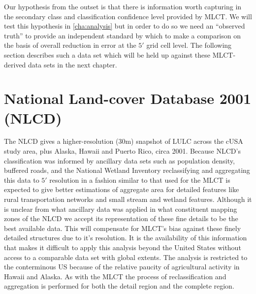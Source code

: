 Our hypothesis from the outset is that there is information worth
capturing in the secondary class and classification confidence level
provided by MLCT.  We will test this hypothesis in
\autoref{cha:analysis} but in order to do so we need an ``observed
truth'' to provide an independent standard by which to make a
comparison on the basis of overall reduction in error at the $5'$ grid
cell level.  The following section describes such a data set which
will be held up against these MLCT-derived data sets in the next
chapter.





\section{National Land-cover Database 2001 (NLCD)}
\label{sec:nlcd}


The NLCD gives a higher-resolution (30m) snapshot of LULC across the
cUSA study area, plus Alaska, Hawaii and Puerto Rico, circa 2001.
Because NLCD's classification was informed by ancillary data sets such
as population density, buffered roads, and the National Wetland
Inventory \citep{Homer2004} reclassifying and aggregating this data to
$5'$ resolution in a fashion similar to that used for the MLCT is
expected to give better estimations of aggregate area for detailed
features like rural transportation networks and small stream and
wetland features.  Although it is unclear from \citet{Homer2004} what
ancillary data was applied in what constituent mapping zones of the
NLCD we accept its representation of these fine details to be the best
available data.  This will compensate for MLCT's bias against these
finely detailed structures due to it's resolution.  It is the
availability of this information that makes it difficult to apply this
analysis beyond the United States without access to a comparable data
set with global extents.  The analysis is restricted to the
conterminous US because of the relative paucity of agricultural
activity in Hawaii and Alaska.  As with the MLCT the process of
reclassification and aggregation is performed for both the detail
region and the complete region.

